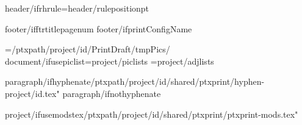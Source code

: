 \def\HeaderPosition{{{header/headerposition}}}
\def\FooterPosition{{{header/footerposition}}}
{header/ifrhrule}\RHruleposition={header/ruleposition}pt
\def\RangeSeparator{{\kern.1em\char"2013\kern.1em}} %
\def\ChapterVerseSeparator{{\kern.02em{header/chvseparator}\kern.02em}} %

\def\RHoddleft{{{header/oddleft}}}
\def\RHoddcenter{{{header/oddcenter}}}
\def\RHoddright{{{header/oddright}}}

\def\RHevenleft{{{header/evenleft}}}
\def\RHevencenter{{{header/evencenter}}}
\def\RHevenright{{{header/evenright}}}


\def\RFoddcenter{{{footer/oddcenter}}}
\def\RFevencenter{{{footer/oddcenter}}}
\def\RFtitlecenter{{{footer/oddcenter}}}
{footer/ifftrtitlepagenum}\def\RFtitlecenter{{\pagenumber}}
{footer/ifprintConfigName}\def\RFtitlecenter{{{config/name}}}

\PicPath={{{/ptxpath}/{project/id}/PrintDraft/tmpPics/}}
{document/ifusepiclist}\PicListPath={{{project/piclists}}}
\AdjListPath={{{project/adjlists}}}

\def\b{{\par\vskip\baselineskip}}
\let\pb=\pagebreak


{paragraph/ifhyphenate}{/ptxpath}/{project/id}/shared/ptxprint/hyphen-{project/id}.tex"
{paragraph/ifnothyphenate}



{project/ifusemodstex}{/ptxpath}/{project/id}/shared/ptxprint/ptxprint-mods.tex"%



